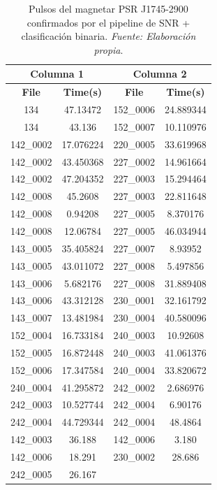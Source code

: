 \begin{table}[H]
    \centering
    \caption{Pulsos del magnetar PSR J1745-2900 confirmados por el pipeline de SNR + clasificación binaria. \textit{Fuente: Elaboración propia}.}
    \label{tab:alma_confirmed_pulses}
    \begin{tabular}{|c|c|c|c|}
        \hline
        \multicolumn{2}{|c|}{\textbf{Columna 1}} & \multicolumn{2}{|c|}{\textbf{Columna 2}} \\
        \hline
        \textbf{File} & \textbf{Time(s)} & \textbf{File} & \textbf{Time(s)} \\
        \hline
        134 & 47.13472 & 152\_0006 & 24.889344 \\
        134 & 43.136 & 152\_0007 & 10.110976 \\
        142\_0002 & 17.076224 & 220\_0005 & 33.619968 \\
        142\_0002 & 43.450368 & 227\_0002 & 14.961664 \\
        142\_0002 & 47.204352 & 227\_0003 & 15.294464 \\
        142\_0008 & 45.2608 & 227\_0003 & 22.811648 \\
        142\_0008 & 0.94208 & 227\_0005 & 8.370176 \\
        142\_0008 & 12.06784 & 227\_0005 & 46.034944 \\
        143\_0005 & 35.405824 & 227\_0007 & 8.93952 \\
        143\_0005 & 43.011072 & 227\_0008 & 5.497856 \\
        143\_0006 & 5.682176 & 227\_0008 & 31.889408 \\
        143\_0006 & 43.312128 & 230\_0001 & 32.161792 \\
        143\_0007 & 13.481984 & 230\_0004 & 40.580096 \\
        152\_0004 & 16.733184 & 240\_0003 & 10.92608 \\
        152\_0005 & 16.872448 & 240\_0003 & 41.061376 \\
        152\_0006 & 17.347584 & 240\_0004 & 33.820672 \\
        240\_0004 & 41.295872 & 242\_0002 & 2.686976 \\
        242\_0003 & 10.527744 & 242\_0004 & 6.90176 \\
        242\_0004 & 44.729344 & 242\_0004 & 48.4864 \\
        142\_0003 & 36.188 & 142\_0006 & 3.180 \\
        142\_0006 & 18.291 & 230\_0002 & 28.686 \\
        242\_0005 & 26.167 & & \\
        \hline
    \end{tabular}
\end{table}

